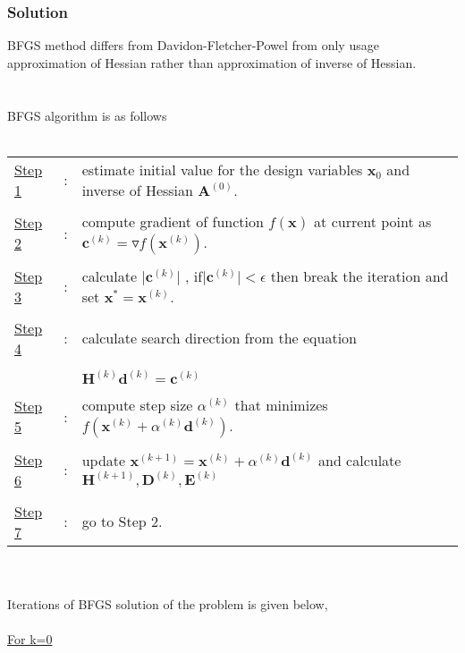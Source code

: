 \documentclass[]{report}
\begin{document}
\subsubsection*{Solution}
BFGS method differs from Davidon-Fletcher-Powel from only usage approximation of Hessian rather than approximation of inverse of Hessian.\\~\\
\newpage
~\\BFGS algorithm is as follows
\\
~\\
\begin{tabular}{lll}
\underline{Step 1} &:& estimate initial value for the design variables $\mathbf x_0$ and inverse of Hessian $\mathbf{A}^{(0)}$.\\ 
&&\\
 \underline{Step 2} &:& compute gradient of function $f\left(\mathbf x\right)$ at current point as $\mathbf c^{(k)}=\triangledown f\left(\mathbf x^{(k)}\right)$.\\ 
 &&\\
 \underline{Step 3} &:& calculate $\lvert \mathbf c^{(k)}\rvert$ ,  if$\lvert \mathbf c^{(k)}\rvert<\epsilon$ then break the iteration and set $\mathbf x^*=\mathbf x^{(k)}$. \\ 
 &&\\
 \underline{Step 4} &:& calculate search direction from the equation\\ 
  &&\\
  && ${\mathbf{H}^{(k)}}\mathbf d^{(k)}= \mathbf{c}^{(k)}$   \\ 
 &&\\
 \underline{Step 5} &:& compute step size $\alpha^{(k)}$ that minimizes $f\left(\mathbf x^{(k)}+\alpha^{(k)}\mathbf d^{(k)}\right)$. \\ 
 &&\\
 \underline{Step 6} &:& update $\mathbf x^{(k+1)}=\mathbf x^{(k)}+\alpha^{(k)}\mathbf d^{(k)}$ and calculate $\mathbf{H}^{(k+1)}, \mathbf{D}^{(k)}, \mathbf{E}^{(k)}$\\
  &&\\
\underline{Step 7} &:& go to Step 2.
\end{tabular} 
~\\~\\
Iterations of BFGS solution of the problem is given below,\\
~\\
\underline{For k=0}
\end{document}
